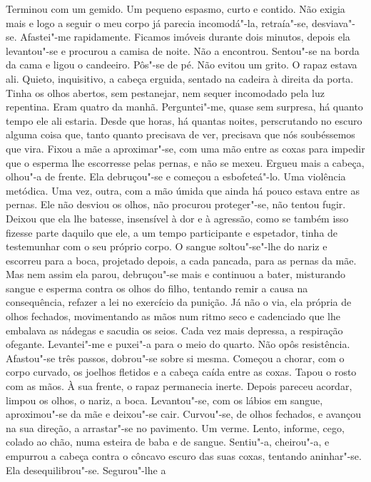 Terminou com um gemido. Um pequeno espasmo, curto e contido. Não exigia
mais e logo a seguir o meu corpo já parecia incomodá"-la, retraía"-se,
desviava"-se. Afastei"-me rapidamente. Ficamos imóveis durante dois
minutos, depois ela levantou"-se e procurou a camisa de noite. Não a
encontrou. Sentou"-se na borda da cama e ligou o candeeiro. Pôs"-se de
pé. Não evitou um grito. O rapaz estava ali. Quieto, inquisitivo, a
cabeça erguida, sentado na cadeira à direita da porta. Tinha os olhos
abertos, sem pestanejar, nem sequer incomodado pela luz repentina. Eram
quatro da manhã. Perguntei"-me, quase sem surpresa, há quanto tempo ele
ali estaria. Desde que horas, há quantas noites, perscrutando no escuro
alguma coisa que, tanto quanto precisava de ver, precisava que nós
soubéssemos que vira. Fixou a mãe a aproximar"-se, com uma mão entre as
coxas para impedir que o esperma lhe escorresse pelas pernas, e não se
mexeu. Ergueu mais a cabeça, olhou"-a de frente. Ela debruçou"-se e
começou a esbofeteá"-lo. Uma violência metódica. Uma vez, outra, com a
mão úmida que ainda há pouco estava entre as pernas. Ele não desviou os
olhos, não procurou proteger"-se, não tentou fugir. Deixou que ela lhe
batesse, insensível à dor e à agressão, como se também isso fizesse
parte daquilo que ele, a um tempo participante e espetador, tinha de
testemunhar com o seu próprio corpo. O sangue soltou"-se"-lhe do nariz e
escorreu para a boca, projetado depois, a cada pancada, para as pernas
da mãe. Mas nem assim ela parou, debruçou"-se mais e continuou a bater,
misturando sangue e esperma contra os olhos do filho, tentando remir a
causa na consequência, refazer a lei no exercício da punição. Já não o
via, ela própria de olhos fechados, movimentando as mãos num ritmo seco
e cadenciado que lhe embalava as nádegas e sacudia os seios. Cada vez
mais depressa, a respiração ofegante. Levantei"-me e puxei"-a para o
meio do quarto. Não opôs resistência. Afastou"-se três passos,
dobrou"-se sobre si mesma. Começou a chorar, com o corpo curvado, os
joelhos fletidos e a cabeça caída entre as coxas. Tapou o rosto com as
mãos. À sua frente, o rapaz permanecia inerte. Depois pareceu acordar,
limpou os olhos, o nariz, a boca. Levantou"-se, com os lábios em sangue,
aproximou"-se da mãe e deixou"-se cair. Curvou"-se, de olhos fechados, e
avançou na sua direção, a arrastar"-se no pavimento. Um verme. Lento,
informe, cego, colado ao chão, numa esteira de baba e de sangue.
Sentiu"-a, cheirou"-a, e empurrou a cabeça contra o côncavo escuro das
suas coxas, tentando aninhar"-se. Ela desequilibrou"-se. Segurou"-lhe a
